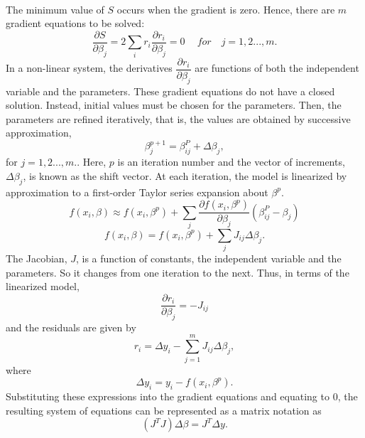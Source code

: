 \documentclass[a4paper,10pt]{report}
\begin{document}
\paragraph*{}
The minimum value of $S$ occurs when the gradient is zero. Hence, there are $m$ gradient equations to be solved:
\begin{equation}
    \dfrac{\partial S}{\partial \beta_j}=2\sum_i r_i\dfrac{\partial r_i}{\partial \beta_j}=0 \ \quad for \quad j=1,2...,m.
\end{equation}
In a non-linear system, the derivatives $\dfrac{\partial r_i}{\partial \beta_j}$ are functions of both the independent variable and the parameters. These gradient equations do not have a closed solution. Instead, initial values must be chosen for the
parameters. Then, the parameters are refined iteratively, that is, the values are obtained by successive approximation,
\begin{equation}
    \beta_j^{p+1}=\beta^P_{ij}+\Delta \beta_j,
\end{equation}
for $j=1,2...,m.$. Here, $p$ is an iteration number and the vector of increments, $\Delta \beta_j$, is known as the shift vector. At each iteration, the model is linearized by approximation to a first-order Taylor series expansion about $\beta^p$.
\begin{equation}
    f(x_i,\beta)\approx f(x_i,\beta^p) +\sum_j \dfrac{\partial f(x_i, \beta^p)}{\partial \beta_j} \left(\beta^P_{ij} -\beta_j \right)
\end{equation}
\begin{equation}
 f(x_i,\beta) =f(x_i, \beta^p)+\sum_j J_{ij} \Delta\beta_j.
\end{equation}
The Jacobian, $J$, is a function of constants, the independent variable and the parameters. So it changes from one iteration to the
next. Thus, in terms of the linearized model,
\begin{equation}
\dfrac{\partial r_i}{\partial \beta_j}=-J_{ij}
\end{equation}
and the residuals are given by
\begin{equation}
    r_i=\Delta y_i- \sum_{j=1}^{m} J_{ij}\Delta\beta_j,
\end{equation}
where
\begin{equation}
 \Delta y_i=y_i- f(x_i, \beta^p).
\end{equation}
Substituting these expressions into the gradient equations and equating to $0$, the resulting system of equations can be represented as a matrix notation as
\begin{equation}
    \left(J^TJ\right)\Delta  \beta=J^T\Delta y.
\end{equation}
\end{document}
